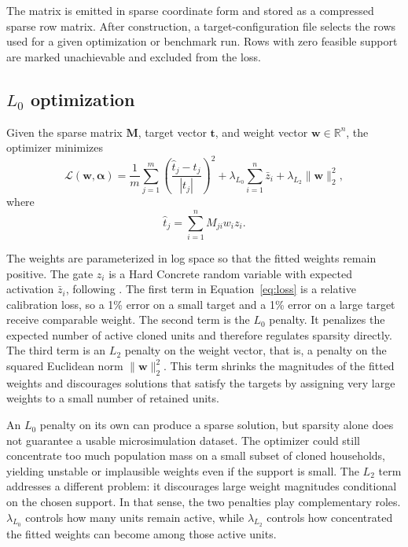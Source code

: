 The matrix is emitted in sparse coordinate form and stored as a compressed sparse row matrix. After
construction, a target-configuration file selects the rows used for a given optimization or
benchmark run. Rows with zero feasible support are marked unachievable and excluded from the loss.

\subsection{\texorpdfstring{$L_0$}{L0} optimization}
\label{sec:l0}

Given the sparse matrix $\mathbf{M}$, target vector $\mathbf{t}$, and weight vector
$\mathbf{w} \in \mathbb{R}^n$, the optimizer minimizes
\begin{equation}
    \mathcal{L}(\mathbf{w}, \boldsymbol{\alpha}) =
    \frac{1}{m} \sum_{j=1}^{m}
    \left(\frac{\hat{t}_j - t_j}{|t_j|}\right)^2 +
    \lambda_{L_0} \sum_{i=1}^{n} \bar{z}_i +
    \lambda_{L_2} \|\mathbf{w}\|_2^2,
    \label{eq:loss}
\end{equation}
where
\begin{equation}
    \hat{t}_j = \sum_{i=1}^{n} M_{ji} w_i z_i.
    \label{eq:estimate}
\end{equation}

The weights are parameterized in log space so that the fitted weights remain positive. The gate
$z_i$ is a Hard Concrete random variable with expected activation $\bar{z}_i$, following
\citet{louizos2018}. The first term in Equation~\ref{eq:loss} is a relative calibration loss, so a
1\% error on a small target and a 1\% error on a large target receive comparable weight. The
second term is the $L_0$ penalty. It penalizes the expected number of active cloned units and
therefore regulates sparsity directly. The third term is an $L_2$ penalty on the weight vector,
that is, a penalty on the squared Euclidean norm $\|\mathbf{w}\|_2^2$. This term shrinks the
magnitudes of the fitted weights and discourages solutions that satisfy the targets by assigning
very large weights to a small number of retained units.

An $L_0$ penalty on its own can produce a sparse solution, but sparsity
alone does not guarantee a usable microsimulation dataset. The optimizer could still concentrate too
much population mass on a small subset of cloned households, yielding unstable or implausible
weights even if the support is small. The $L_2$ term addresses a different problem: it discourages
large weight magnitudes conditional on the chosen support. In that sense, the two penalties play
complementary roles. $\lambda_{L_0}$ controls how many units remain active, while $\lambda_{L_2}$
controls how concentrated the fitted weights can become among those active units.

